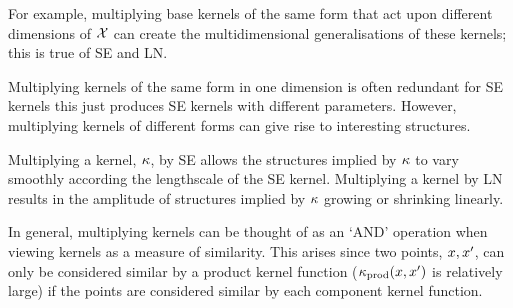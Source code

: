 \documentclass[twoside]{article}
\begin{document}
For example, multiplying base kernels of the same form that act upon different dimensions of $\mathcal{X}$ can create the multidimensional generalisations of these kernels; this is true of \eg SE and LN.

Multiplying kernels of the same form in one dimension is often redundant \eg for SE kernels this just produces SE kernels with different parameters.
However, multiplying kernels of different forms can give rise to interesting structures.

Multiplying a kernel, $\kappa$, by SE allows the structures implied by $\kappa$ to vary smoothly according the lengthscale of the SE kernel.
Multiplying a kernel by LN results in the amplitude of structures implied by $\kappa$ growing or shrinking linearly.


In general, multiplying kernels can be thought of as an `AND' operation when viewing kernels as a measure of similarity.
This arises since two points, $x,x'$, can only be considered similar by a product kernel function (\ie $\kappa_\textrm{prod}(x,x')$ is relatively large) if the points are considered similar by each component kernel function.



%
\end{document}
